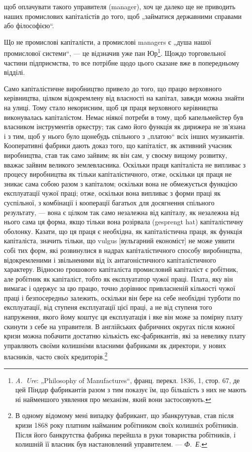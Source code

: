 \parcont{}  %
щоб оплачувати такого управителя (manager), хоч це далеко
ще не приводить наших промислових капіталістів до того, щоб
„займатися державними справами або філософією“.

Що не промислові капіталісти, а промислові managers є „душа
нашої промислової системи“, — це відзначив уже пан Юр\footnote{
\emph{A.~Ure}: „Philosophy of Manufactures“, франц. перекл. 1836, 1, стор. 67,
де цей Піндар фабрикантів разом з тим показує їм, що більшість з них не
мають ні найменшого уявлення про механізм, який вони застосовують.
}.
Щождо торговельної частини підприємства, то все потрібне
щодо цього сказане вже в попередньому відділі.

Само капіталістичне виробництво привело до того, що працю
верховного керівництва, цілком відокремлену від власності на капітал,
завжди можна знайти на улиці. Тому стало некорисним, щоб ця
праця верховного керівництва виконувалась капіталістом. Немає
ніякої потреби в тому, щоб капельмейстер був власником інструментів
оркестру; так само його функція як дирижера не зв’язана і з тим,
щоб у нього було щонебудь спільного з „платою“ всіх інших музикантів.
Кооперативні фабрики дають доказ того, що капіталіст, як
активний учасник виробництва, став так само зайвим; як він сам,
у своєму вищому розвитку, вважає зайвим великого землевласника.
Оскільки праця капіталіста не випливає з процесу виробництва
як тільки капіталістичного, отже, оскільки ця праця не
зникає сама собою разом з капіталом; оскільки вона не обмежується
функцією експлуатації чужої праці; отже, оскільки вона
випливає з форми праці як суспільної, з комбінації і кооперації
багатьох для досягнення спільного результату, — вона є цілком так
само незалежна від капіталу, як незалежна від нього сама ця форма,
якщо тільки вона розірвала (gesprengt hat) капіталістичну оболонку.
Казати, що ця праця є необхідна, як капіталістична праця,
як функція капіталіста, значить тільки, що vulgus [вульгарний
економіст] не може уявити собі тих форм, які розвинулися
в надрах капіталістичного способу виробництва, відокремленими
і звільненими від їх антагоністичного капіталістичного характеру.
Відносно грошового капіталіста промисловий капіталіст
є робітник, але робітник як капіталіст, тобто як експлуататор
чужої праці. Плата, яку він вимагає і одержує за цю працю,
точно дорівнює привласненій кількості чужої праці і безпосередньо
залежить, оскільки він бере на себе необхідні турботи по
експлуатації, від ступеня експлуатації цієї праці, а не від ступеня
того напруження, якого йому коштує ця експлуатація і яке він може
за помірну плату скинути з себе на управителя. В англійських
фабричних округах після кожної кризи можна побачити достатню
кількість екс-фабрикантів, які за невелику плату управляють
своїми колишніми власними фабриками як директори, у нових власників,
часто своїх кредиторів.\footnote{
В одному відомому мені випадку фабрикант, що збанкрутував, став після
кризи 1868 року платним найманим робітником своїх колишніх робітників. Після
його банкрутства фабрика перейшла в руки товариства робітників, і колишній
її власник був настановлений управителем. — \emph{Ф.~Е.}
}
